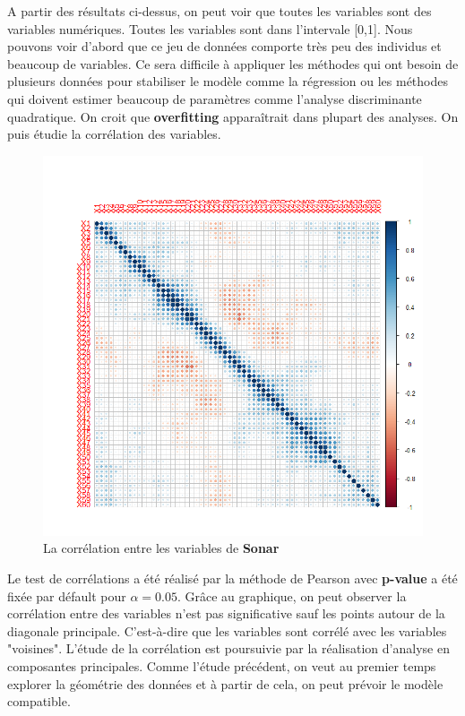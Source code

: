 \documentclass[a4paper,11pt,oneside,roman]{article}
\begin{document}
A partir des résultats ci-dessus, on peut voir que toutes les variables sont des variables numériques. Toutes les variables sont dans l'intervale [0,1]. Nous pouvons voir d'abord que ce jeu de données comporte très peu des individus et beaucoup de variables. Ce sera difficile à appliquer les méthodes qui ont besoin de plusieurs données pour stabiliser le modèle comme la régression ou les méthodes qui doivent estimer beaucoup de paramètres comme l'analyse discriminante quadratique. On croit que \textbf{overfitting} apparaîtrait dans plupart des analyses. On puis étudie la corrélation des variables.
\newline
\begin{figure}[htb]
    \centering
    \includegraphics[scale = .4]{./discrimination/Sonar/corrplot.png} 
    \caption{La corrélation entre les variables de \textbf{Sonar}}
    \label{my_label}
\end{figure}
Le test de corrélations a été réalisé par la méthode de Pearson avec \textbf{p-value} a été fixée par défault pour $\alpha = 0.05$. Grâce au graphique, on peut observer la corrélation entre des variables n'est pas significative sauf les points autour de la diagonale principale. C'est-à-dire que les variables sont corrélé avec les variables "voisines". L'étude de la corrélation est poursuivie par la réalisation d'analyse en composantes principales. Comme l'étude précédent, on veut au premier temps explorer la géométrie des données et à partir de cela, on peut prévoir le modèle compatible. \newline
\end{document}
